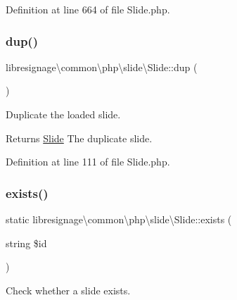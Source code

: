 Definition at line 664 of file Slide.\+php.

\mbox{\label{classlibresignage_1_1common_1_1php_1_1slide_1_1Slide_a793ec38db84338d4014696b046b4dc11}} 
\subsubsection{\texorpdfstring{dup()}{dup()}}
{\footnotesize\ttfamily libresignage\textbackslash{}common\textbackslash{}php\textbackslash{}slide\textbackslash{}\+Slide\+::dup (\begin{DoxyParamCaption}{ }\end{DoxyParamCaption})}

Duplicate the loaded slide.

\begin{DoxyReturn}{Returns}
\hyperlink{classlibresignage_1_1common_1_1php_1_1slide_1_1Slide}{Slide} The duplicate slide. 
\end{DoxyReturn}


Definition at line 111 of file Slide.\+php.

\mbox{\label{classlibresignage_1_1common_1_1php_1_1slide_1_1Slide_a1b2ac4d07a7a9b2e2bf67bcbbaee0130}} 
\subsubsection{\texorpdfstring{exists()}{exists()}}
{\footnotesize\ttfamily static libresignage\textbackslash{}common\textbackslash{}php\textbackslash{}slide\textbackslash{}\+Slide\+::exists (\begin{DoxyParamCaption}\item[{string}]{\$id }\end{DoxyParamCaption})\hspace{0.3cm}{\ttfamily [static]}}

Check whether a slide exists.


